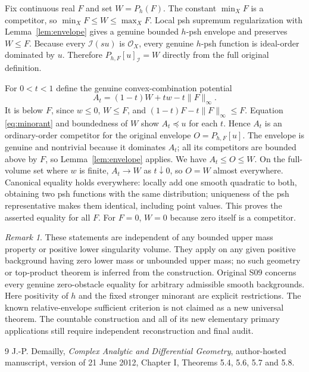 \documentclass[11pt]{article}
\theoremstyle{remark}\newtheorem{remark}[theorem]{Remark}
\newcommand{\OO}{\mathcal O_X}
\begin{document}
Fix continuous real $F$ and set $W=P_h(F)$. The constant $\min_XF$
is a competitor, so $\min_XF\leq W\leq\max_XF$. Local psh supremum
regularization with Lemma~\ref{lem:envelope} gives a genuine bounded
$h$-psh envelope and preserves $W\leq F$.
Because every $\mathcal I(su)$ is $\OO$, every genuine $h$-psh function
is ideal-order dominated by $u$. Therefore $P_{h,F}[u]_{\mathcal I}=W$
directly from the full original definition.

For $0<t<1$ define the genuine convex-combination potential
\[
 A_t=(1-t)W+tw-t\|F\|_\infty.
\]
It is below $F$, since $w\leq0$, $W\leq F$, and
$(1-t)F-t\|F\|_\infty\leq F$. Equation \eqref{eq:minorant} and
boundedness of $W$ show $A_t\preceq u$ for each $t$. Hence $A_t$ is
an ordinary-order competitor for the original envelope $O=P_{h,F}[u]$.
The envelope is genuine and nontrivial because it dominates $A_t$;
all its competitors are bounded above by $F$, so
Lemma~\ref{lem:envelope} applies. We have $A_t\leq O\leq W$.
On the full-volume set where $w$ is finite, $A_t\to W$ as $t\downarrow0$,
so $O=W$ almost everywhere. Canonical equality holds everywhere: locally
add one smooth quadratic to both, obtaining two psh functions with the
same distribution; uniqueness of the psh representative
\cite[Theorem I.5.8]{Dem} makes them identical, including point values.
This proves the asserted equality for all $F$. For $F=0$, $W=0$ because
zero itself is a competitor.

\begin{remark}
These statements are independent of any bounded upper mass property or
positive lower singularity volume. They apply on any given positive
background having zero lower mass or unbounded upper mass; no such
geometry or top-product theorem is inferred from the construction.
Original S09 concerns every genuine zero-obstacle equality for arbitrary
admissible smooth backgrounds. Here positivity of $h$ and the fixed
stronger minorant are explicit restrictions. The known relative-envelope
sufficient criterion is not claimed as a new universal theorem. The
countable construction and all of its new elementary primary applications
still require independent reconstruction and final audit.
\end{remark}

\begin{thebibliography}{9}
 J.-P. Demailly, \emph{Complex Analytic and Differential
Geometry}, author-hosted manuscript, version of 21 June 2012, Chapter I,
Theorems 5.4, 5.6, 5.7 and 5.8.
\end{thebibliography}
\end{document}
